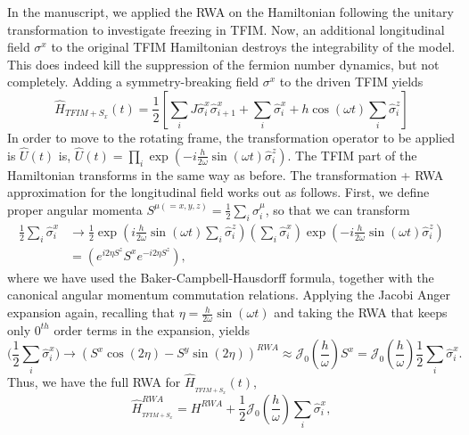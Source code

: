 \documentclass[aps,prb,reprint,showpacs,floatfix,superscriptaddress, onecolumn, nofootinbib, 9pt]{revtex4-2}
\begin{document}
\begin{enumerate}
{		In the manuscript, we applied the RWA on the Hamiltonian following the unitary transformation to investigate freezing in TFIM. Now, an additional longitudinal field $\sigma^x$ to the original TFIM Hamiltonian destroys the integrability of the model.  This does indeed kill the suppression of the fermion number dynamics, but not completely.  Adding a symmetry-breaking field $\sigma^x$ to the driven TFIM yields 
		\begin{equation}
			\hat{H}_{TFIM+S_x}(t) =\frac{1}{2}\left[\sum_{i} J \hat{\sigma}_{i}^{x} \hat{\sigma}_{i+1}^{x}+\sum_{i} \hat{\sigma}_{i}^{x}+h \cos (\omega t) \sum_{i} \hat{\sigma}_{i}^{z}\right]
			\end{equation}
		In order to move to the rotating frame, the transformation operator to be applied is $\displaystyle \hat{U}(t)$ is, $\hat{U}(t)=\prod_{i} \exp \left(-i \frac{h}{2 \omega} \sin (\omega t) \hat{\sigma}_{i}^{z}\right)$. The TFIM part of the Hamiltonian transforms in the same way as before.	The transformation + RWA approximation for the longitudinal field works out as follows. First, we define proper angular momenta $\displaystyle S^{\mu(=x,y,z)} = \frac12\sum_i \hat{\sigma}^\mu_i$, so that we can transform
		\begin{align*}
			\frac12 \sum_i \hat{\sigma}^x_i & \rightarrow\frac{1}{2} \exp \left(i \frac{h}{2 \omega} \sin (\omega t) \sum_{i} \hat{\sigma}_{i}^{z}\right)\left(\sum_{i} \hat{\sigma}_{i}^{x}\right) \exp \left(-i \frac{h}{2 \omega} \sin (\omega t) \hat{\sigma}_{i}^{z}\right) \\
				& =\left(e^{i 2 \eta S^{z}} S^{x} e^{-i 2 \eta S^{z}}\right),
		\end{align*}
		where we have used the Baker-Campbell-Hausdorff formula, together with the canonical angular momentum commutation relations. Applying the Jacobi Anger expansion again, recalling that $\eta=\frac{h}{2 \omega} \sin (\omega t)$ and taking the RWA that keeps only $0^{th}$ order terms in the expansion, yields
		\begin{equation}
			\Big(\frac12 \sum_i \hat{\sigma}^x_i\Big) \rightarrow \left(S^{x} \cos (2 \eta)-S^{y} \sin (2 \eta)\right)^{RWA} \approx \mathcal{J}_{0}\left(\frac{h}{\omega}\right) S^{x} = \mathcal{J}_{0}\left(\frac{h}{\omega}\right)\frac12\sum_i\hat{\sigma}^x_i.
		\end{equation}
		Thus, we have the full RWA for $\hat{H}_{_{TFIM+S_{x}}}(t)$,
		\begin{equation}
			\hat{H}_{_{TFIM+S_{x}}}^{R W A}= H^{RWA}+\frac12 \mathcal{J}_{0}\left(\frac{h}{\omega}\right) \sum_i\hat{\sigma}^x_i,

\end{equation}}
\end{enumerate}
\end{document}
